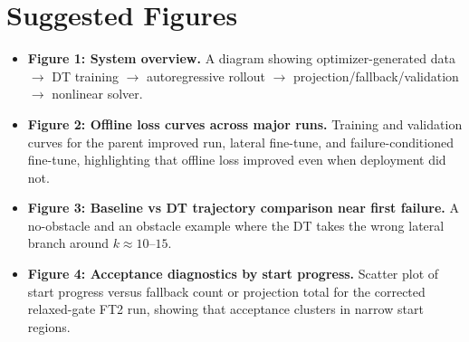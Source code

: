\section{Suggested Figures}

\begin{itemize}
\item \textbf{Figure 1: System overview.} A diagram showing optimizer-generated data $\rightarrow$ DT training $\rightarrow$ autoregressive rollout $\rightarrow$ projection/fallback/validation $\rightarrow$ nonlinear solver.
\item \textbf{Figure 2: Offline loss curves across major runs.} Training and validation curves for the parent improved run, lateral fine-tune, and failure-conditioned fine-tune, highlighting that offline loss improved even when deployment did not.
\item \textbf{Figure 3: Baseline vs DT trajectory comparison near first failure.} A no-obstacle and an obstacle example where the DT takes the wrong lateral branch around $k\approx 10$--$15$.
\item \textbf{Figure 4: Acceptance diagnostics by start progress.} Scatter plot of start progress versus fallback count or projection total for the corrected relaxed-gate FT2 run, showing that acceptance clusters in narrow start regions.
\end{itemize}
